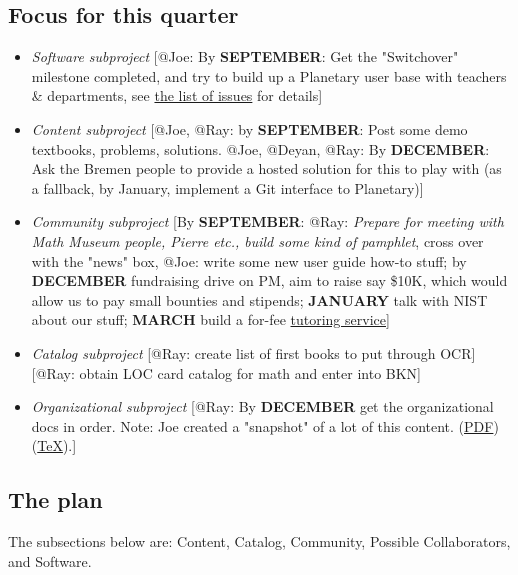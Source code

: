 \subsection{Focus for this quarter}
\begin{itemize}
\item \emph{Software subproject} [@Joe: By {\bf SEPTEMBER}: Get
the "Switchover" milestone completed, and try
to build up a Planetary user base with
teachers \& departments, see
\href{https://github.com/cdavid/drupal_planetary/issues?milestone=2&page=1&state=open}{the list of issues} for details]
\item \emph{Content subproject} [@Joe, @Ray: by {\bf SEPTEMBER}: Post
 some demo textbooks, problems,
 solutions.  @Joe, @Deyan, @Ray: By {\bf DECEMBER}:
 Ask the Bremen people to provide a hosted
 solution for this to play with (as a
 fallback, by January, implement a Git interface to
 Planetary)]
\item \emph{Community subproject}
 [By {\bf SEPTEMBER}: 
@Ray: \emph{Prepare for meeting with Math
  Museum people, Pierre etc., build some kind of pamphlet},
  cross over with the "news" box, @Joe: write some new user guide
 how-to stuff; by {\bf DECEMBER}
  fundraising drive on PM, aim to raise say \$10K,
  which would allow us to pay small bounties and
  stipends; {\bf JANUARY} talk with NIST about our stuff; {\bf MARCH} build a for-fee
  \href{http://metameso.org/~joe/docs/bce.pdf}{tutoring service}]
\item \emph{Catalog subproject} [@Ray: create list of first books to put through OCR]
[@Ray: obtain LOC card catalog for math and enter into BKN]
\item \emph{Organizational subproject} [@Ray: By {\bf DECEMBER} get the organizational
docs in order.  Note: Joe created a "snapshot" of a lot of this content.
(\href{http://metameso.org/~joe/docs/hhgtpm.pdf}{PDF})
(\href{http://metameso.org/~joe/docs/hhgtpm.tex}{TeX}).]
\end{itemize}

\subsection{The plan}
The subsections below are: Content, Catalog, Community,
Possible Collaborators, and Software.

